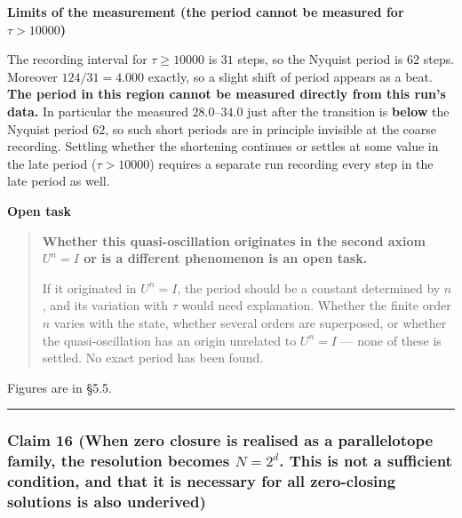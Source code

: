 \documentclass[
  10pt,
]{article}
\newcounter{none} %
\begin{document}
\textbf{Limits of the measurement (the period cannot be measured for
\(\tau>10000\))}

The recording interval for \(\tau\ge10000\) is \(31\) steps, so the
Nyquist period is \(62\) steps. Moreover \(124/31 = 4.000\) exactly, so
a slight shift of period appears as a beat. \textbf{The period in this
region cannot be measured directly from this run's data.} In particular
the measured \(28.0\)--\(34.0\) just after the transition is
\textbf{below} the Nyquist period \(62\), so such short periods are in
principle invisible at the coarse recording. Settling whether the
shortening continues or settles at some value in the late period
(\(\tau>10000\)) requires a separate run recording every step in the
late period as well.

\textbf{Open task}

\begin{quote}
\textbf{Whether this quasi-oscillation originates in the second axiom
\(U^n=I\) or is a different phenomenon is an open task.}

If it originated in \(U^n=I\), the period should be a constant
determined by \(n\), and its variation with \(\tau\) would need
explanation. Whether the finite order \(n\) varies with the state,
whether several orders are superposed, or whether the quasi-oscillation
has an origin unrelated to \(U^n=I\) --- none of these is settled. No
exact period has been found.
\end{quote}

Figures are in §5.5.

\begin{center}\rule{0.5\linewidth}{0.5pt}\end{center}

\subsubsection{\texorpdfstring{Claim 16 (When zero closure is realised
as a parallelotope family, the resolution becomes \(N=2^d\). This is not
a sufficient condition, and that it is necessary for all zero-closing
solutions is also
underived)}{Claim 16 (When zero closure is realised as a parallelotope family, the resolution becomes N=2\^{}d. This is not a sufficient condition, and that it is necessary for all zero-closing solutions is also underived)}}\label{claim-16-when-zero-closure-is-realised-as-a-parallelotope-family-the-resolution-becomes-n2d.-this-is-not-a-sufficient-condition-and-that-it-is-necessary-for-all-zero-closing-solutions-is-also-underived}
\end{document}
